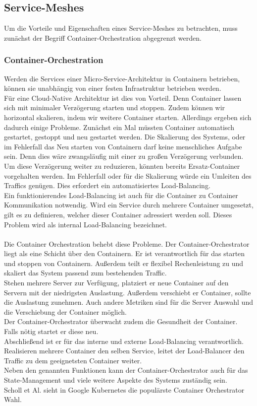 \subsection{Service-Meshes}
Um die Vorteile und Eigenschaften eines Service-Meshes zu betrachten, muss zunächst der Begriff Container-Orchestration abgegrenzt werden.
\subsubsection{Container-Orchestration}
Werden die Services einer Micro-Service-Architektur in Containern betrieben, können sie unabhängig von einer festen Infrastruktur betrieben werden.\\
Für eine Cloud-Native Architektur ist dies von Vorteil. Denn Container lassen sich mit minimaler Verzögerung starten und stoppen. Zudem können wir horizontal skalieren, indem wir weitere Container starten. Allerdings ergeben sich dadurch einige Probleme. Zunächst ein Mal müssten Container automatisch gestartet, gestoppt und neu gestartet werden. Die Skalierung des Systems, oder im Fehlerfall das Neu starten von Containern darf keine menschliches Aufgabe sein. Denn dies wäre zwangsläufig mit einer zu großen Verzögerung verbunden.\\
Um diese Verzögerung weiter zu reduzieren, könnten bereits Ersatz-Container vorgehalten werden. Im Fehlerfall oder für die Skalierung würde ein Umleiten des Traffics genügen. Dies erfordert ein automatisiertes Load-Balancing.\\
Ein funktionierendes Load-Balancing ist auch für die Container zu Container Kommunikation notwendig. Wird ein Service durch mehrere Container umgesetzt, gilt es zu definieren, welcher dieser Container adressiert werden soll. Dieses Problem wird als internal Load-Balancing bezeichnet. \\\\
Die Container Orchestration behebt diese Probleme. Der Container-Orchestrator liegt als eine Schicht über den Containern. Er ist verantwortlich für das starten und stoppen von Containern. Außerdem teilt er flexibel Rechenleistung zu und skaliert das System passend zum bestehenden Traffic.\\
Stehen mehrere Server zur Verfügung, platziert er neue Container auf den Servern mit der niedrigsten Auslastung. Außerdem verschiebt er Container, sollte die Auslastung zunehmen. Auch andere Metriken sind für die Server Auswahl und die Verschiebung der Container möglich.\\
Der Container-Orchestrator überwacht zudem die Gesundheit der Container. Falls nötig startet er diese neu.\\
Abschließend ist er für das interne und externe Load-Balancing verantwortlich. Realisieren mehrere Container den selben Service, leitet der Load-Balancer den Traffic zu dem geeignetsten Container weiter. \\
Neben den genannten Funktionen kann der Container-Orchestrator auch für das State-Management und viele weitere Aspekte des Systems zuständig sein.\\
Scholl et Al.\cite{scholl_cloud_2019} sieht in Google Kubernetes die populärste Container Orchestrator Wahl.
